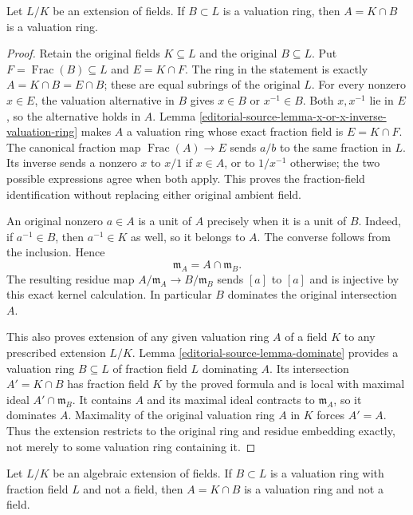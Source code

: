 \begin{lemma}
\label{editorial-source-lemma-valuation-ring-cap-field}
Let $L/K$ be an extension of fields. If $B \subset L$
is a valuation ring, then $A = K \cap B$ is a valuation ring.
\end{lemma}

\begin{proof}
Retain the original fields $K\subseteq L$
and the original $B\subseteq L$.
Put $F=\operatorname{Frac}(B)\subseteq L$
and $E=K\cap F$. The ring in
the statement is exactly
$A=K\cap B=E\cap B$; these
are equal subrings of the
original $L$. For every
nonzero $x\in E$, the
valuation alternative in $B$
gives $x\in B$ or $x^{-1}\in B$.
Both $x,x^{-1}$ lie in $E$,
so the alternative holds in
$A$. Lemma
\ref{editorial-source-lemma-x-or-x-inverse-valuation-ring}
makes $A$ a valuation ring
whose exact fraction field
is $E=K\cap F$.
The canonical fraction map
$\operatorname{Frac}(A)\to E$
sends $a/b$ to the same
fraction in $L$. Its inverse
sends a nonzero $x$ to
$x/1$ if $x\in A$, or
to $1/x^{-1}$ otherwise;
the two possible expressions
agree when both apply.
This proves the fraction-field
identification without replacing
either original ambient field.

An original nonzero $a\in A$
is a unit of $A$ precisely
when it is a unit of $B$.
Indeed, if $a^{-1}\in B$,
then $a^{-1}\in K$ as well,
so it belongs to $A$.
The converse follows from
the inclusion. Hence
$$
\mathfrak m_A=A\cap\mathfrak m_B.
$$
The resulting residue map
$A/\mathfrak m_A\to B/\mathfrak m_B$
sends $[a]$ to $[a]$ and
is injective by this exact
kernel calculation. In particular
$B$ dominates the original
intersection $A$.

This also proves extension
of any given valuation ring
$A$ of a field $K$ to
any prescribed extension $L/K$.
Lemma \ref{editorial-source-lemma-dominate}
provides a valuation ring
$B\subseteq L$ of fraction
field $L$ dominating $A$.
Its intersection $A'=K\cap B$
has fraction field $K$ by
the proved formula and is
local with maximal ideal
$A'\cap\mathfrak m_B$.
It contains $A$ and its
maximal ideal contracts to
$\mathfrak m_A$, so it
dominates $A$. Maximality
of the original valuation
ring $A$ in $K$ forces
$A'=A$. Thus the extension
restricts to the original
ring and residue embedding
exactly, not merely to some
valuation ring containing it.
\end{proof}

\begin{lemma}
\label{editorial-source-lemma-valuation-ring-cap-field-finite}
Let $L/K$ be an algebraic extension of fields. If $B \subset L$
is a valuation ring with fraction field $L$ and not a field, then
$A = K \cap B$ is a valuation ring and not a field.
\end{lemma}

